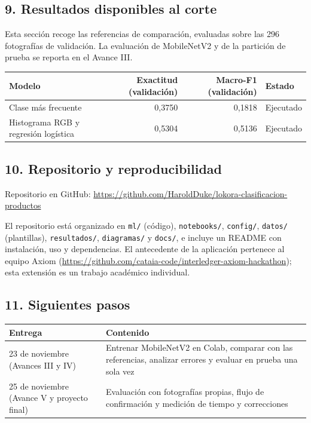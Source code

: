 \documentclass[11pt,a4paper]{article}
\begin{document}
\subsection*{9. Resultados disponibles al corte}
\noindent Esta sección recoge las referencias de comparación, evaluadas sobre las 296 fotografías de validación. La evaluación de MobileNetV2 y de la partición de prueba se reporta en el Avance III.\par
\begin{center}\small
\begin{tabularx}{\textwidth}{XrrX}
\toprule
\textbf{Modelo} & \textbf{Exactitud (validación)} & \textbf{Macro-F1 (validación)} & \textbf{Estado} \\
\midrule
Clase más frecuente & 0,3750 & 0,1818 & Ejecutado \\
Histograma RGB y regresión logística & 0,5304 & 0,5136 & Ejecutado \\
\bottomrule
\end{tabularx}
\end{center}
\subsection*{10. Repositorio y reproducibilidad}
\noindent Repositorio en GitHub: \url{https://github.com/HaroldDuke/lokora-clasificacion-productos}\par
\noindent El repositorio está organizado en \texttt{ml/} (código), \texttt{notebooks/}, \texttt{config/}, \texttt{datos/} (plantillas), \texttt{resultados/}, \texttt{diagramas/} y \texttt{docs/}, e incluye un README con instalación, uso y dependencias. El antecedente de la aplicación pertenece al equipo Axiom (\url{https://github.com/cataia-code/interledger-axiom-hackathon}); esta extensión es un trabajo académico individual.\par
\subsection*{11. Siguientes pasos}
\begin{center}\small
\begin{tabularx}{\textwidth}{XX}
\toprule
\textbf{Entrega} & \textbf{Contenido} \\
\midrule
23 de noviembre (Avances III y IV) & Entrenar MobileNetV2 en Colab, comparar con las referencias, analizar errores y evaluar en prueba una sola vez \\
25 de noviembre (Avance V y proyecto final) & Evaluación con fotografías propias, flujo de confirmación y medición de tiempo y correcciones \\
\bottomrule
\end{tabularx}
\end{center}
\end{document}

